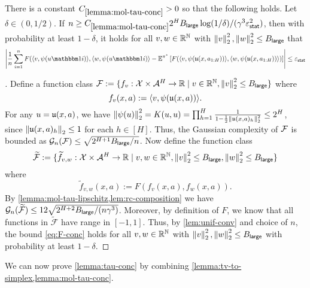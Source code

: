 \begin{lemma}\label{lemma:mol-tau-conc}
There is a constant $C_{\ref{lemma:mol-tau-conc}}>0$ so that the following holds. Let $\delta \in (0,1/2)$. If $n \geq C_{\ref{lemma:mol-tau-conc}} 2^H B_{\mathsf{large}} \log(1/\delta)/(\gamma^3 \varepsilon_{\mathsf{stat}}^2)$, then with probability at least $1-\delta$, it holds for all $v,w \in \mathbb{R}^{\mathbb{N}}$ with $\left \lVert v \right \rVert_2^2 , \left \lVert w \right \rVert_2^2 \leq B_{\mathsf{large}}$ that
\begin{align}
\left|\frac{1}{n} \sum_{i=1}^n F(\langle v,\psi(u\ind{i})\rangle,\langle w, \psi(u\ind{i})\rangle - \En^{\pistar} \left[F(\langle v,\psi(\uop{x}{a_{1:H}})\rangle,\langle w, \psi(\uop{x}{a_{1:H}})\rangle) \right]\right| \leq \epstat
\label{eq:F-conc}
\end{align}
\end{lemma}

\begin{proof}[]
Define a function class $\mathcal{F} := \{f_v: \mathcal{X} \times \mathcal{A}^H \to \mathbb{R} \mid v \in \mathbb{R}^{\mathbb{N}}, \left \lVert v \right \rVert_2^2 \leq B_{\mathsf{large}}\}$
where
\[f_v(x,a) := \langle v, \psi(\mathfrak{u}(x,a))\rangle.\]
For any $u = \mathfrak{u}(x,a)$, we have $\left \lVert \psi(u) \right \rVert_2^2 = K(u,u) = \prod_{h=1}^H \frac{1}{1-\frac{1}{2}\left \lVert \mathfrak{u}(x,a)_h \right \rVert_2^2} \leq 2^H$, since $\left \lVert \mathfrak{u}(x,a)_h \right \rVert_2 \leq 1$ for each $h \in [H]$. Thus, the Gaussian complexity of $\mathcal{F}$ is bounded as $\mathcal{G}_n(\mathcal{F}) \leq \sqrt{2^{H+1} B_{\mathsf{large}}/n}$. Now define the function class \[\mathcal{\widetilde F} := \{\widetilde f_{v,w}: \mathcal{X} \times \mathcal{A}^H \to \mathbb{R} \mid v,w \in \mathbb{R}^{\mathbb{N}}, \left \lVert v \right \rVert_2^2 \leq B_{\mathsf{large}}, \left \lVert w \right \rVert_2^2 \leq B_{\mathsf{large}}\}\]
where
\[\widetilde f_{v,w}(x,a) := F(f_v(x,a),f_w(x,a)).\]
By \cref{lemma:mol-tau-lipschitz,lem:rc-composition} we have $\mathcal{G}_n(\mathcal{\widetilde{F}}) \leq 12\sqrt{2^{H+2} B_{\mathsf{large}}/(n\gamma^3)}$. Moreover, by definition of $F$, we know that all functions in $\mathcal{\widetilde F}$ have range in $[-1,1]$. Thus, by \cref{lem:unif-conv} and choice of $n$, the bound \eqref{eq:F-conc} holds for all $v,w \in \mathbb{R}^{\mathbb{N}}$ with $\left \lVert v \right \rVert_2^2,\left \lVert w \right \rVert_2^2 \leq B_{\mathsf{large}}$ with probability at least $1-\delta$.
\end{proof}





We can now prove \cref{lemma:tau-conc} by combining \cref{lemma:tv-to-simplex,lemma:mol-tau-conc}.


